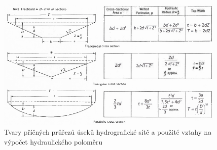 \begin{figure}
  \centering
  \includegraphics[width=\textwidth]{./img/tvarykoryt}
  \caption{Tvary příčných průřezů úseků hydrografické sítě a použité vztahy na výpočet hydraulického poloměru}
  \label{fig:tvary_koryt}
\end{figure}
